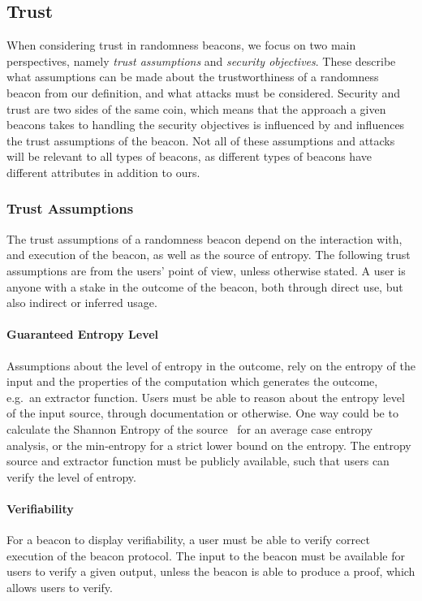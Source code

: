 \subsection{Trust}
When considering trust in randomness beacons, we focus on two main perspectives, namely \emph{trust assumptions} and \emph{security objectives}.
These describe what assumptions can be made about the trustworthiness of a randomness beacon from our definition, and what attacks must be considered.
Security and trust are two sides of the same coin, which means that the approach a given beacons takes to handling the security objectives is influenced by and influences the trust assumptions of the beacon.
Not all of these assumptions and attacks will be relevant to all types of beacons, as different types of beacons have different attributes in addition to ours.

\subsubsection{Trust Assumptions}\label{ssub:trust_assumptions}
The trust assumptions of a randomness beacon depend on the interaction with, and execution of the beacon, as well as the source of entropy.
The following trust assumptions are from the users' point of view, unless otherwise stated.
A user is anyone with a stake in the outcome of the beacon, both through direct use, but also indirect or inferred usage.

\paragraph{Guaranteed Entropy Level}
    Assumptions about the level of entropy in the outcome, rely on the entropy of the input and the properties of the computation which generates the outcome, e.g.\ an extractor function.
    Users must be able to reason about the entropy level of the input source, through documentation or otherwise.
    One way could be to calculate the Shannon Entropy of the source~\cite{informationtheory} for an average case entropy analysis, or the min-entropy for a strict lower bound on the entropy.
    The entropy source and extractor function must be publicly available, such that users can verify the level of entropy.

\paragraph{Verifiability}
    For a beacon to display verifiability, a user must be able to verify correct execution of the beacon protocol.
    The input to the beacon must be available for users to verify a given output, unless the beacon is able to produce a proof, which allows users to verify.

